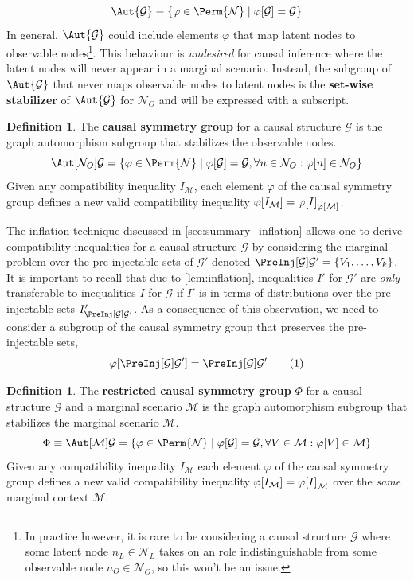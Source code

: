 \documentclass[aps, 10pt, english, twoside, pra, nofootinbib, longbibliography]{revtex4-1}
\theoremstyle{plain}
\theoremstyle{definition}
\newtheorem{definition}[theorem]{Definition}
\theoremstyle{remark}
\newcommand{\graph}{\mathcal{G}}
\newcommand{\nodes}{\mathcal{N}}
\newcommand{\gep}{\varphi}
\newcommand{\gp}{\Phi}
\newcommand{\mscenario}{\mathcal{M}}
\newcommand{\term}[1]{\textcolor{Mahogany}{\textbf{#1}}}
\begin{document}
    \[ \Aut{\graph} \defined \bc{\gep \in \Perm{\nodes} \mid \gep\bs{\graph} = \graph} \]
    In general, $\Aut{\graph}$ could include elements $\gep$ that map latent nodes to observable nodes\footnote{In practice however, it is rare to be considering a causal structure $\graph$ where some latent node $n_L \in \nodes_L$ takes on an role indistinguishable from some observable node $n_O \in \nodes_O$, so this won't be an issue.}. This behaviour is \textit{undesired} for causal inference where the latent nodes will never appear in a marginal scenario. Instead, the subgroup of $\Aut{\graph}$ that never maps observable nodes to latent nodes is the \term{set-wise stabilizer} of $\Aut{\graph}$ for $\nodes_O$ and will be expressed with a subscript.

    \begin{definition}
        The \term{causal symmetry group} for a causal structure $\graph$ is the graph automorphism subgroup that stabilizes the observable nodes.
        \[ \Aut[\nodes_O]{\graph} = \bc{\gep \in \Perm{\nodes} \mid \gep\bs{\graph} = \graph, \forall n \in \nodes_O :\gep\bs{n} \in \nodes_O} \]
        Given any compatibility inequality $I_{\mscenario}$, each element $\gep$ of the causal symmetry group defines a new valid compatibility inequality $\gep\bs{I_{\mscenario}} = \gep\bs{I}_{\gep\bs{\mscenario}}$.
    \end{definition}

    The inflation technique discussed in \cref{sec:summary_inflation} allows one to derive compatibility inequalities for a causal structure $\graph$ by considering the marginal problem over the pre-injectable sets of $\graph'$ denoted $\PreInj[\graph]{\graph'} = \bc{V_1, \ldots, V_k}$. It is important to recall that due to \cref{lem:inflation}, inequalities $I'$ for $\graph'$ are \textit{only} transferable to inequalities $I$ for $\graph$ if $I'$ is in terms of distributions over the pre-injectable sets $I'_{\PreInj[\graph]{\graph'}}$. As a consequence of this observation, we need to consider a subgroup of the causal symmetry group that preserves the pre-injectable sets,
    \[ \gep\bs{\PreInj[\graph]{\graph'}} = \PreInj[\graph]{\graph'} \eq \label{eq:preserved_preinj} \]

    \begin{definition}
        The \term{restricted causal symmetry group} $\gp$ for a causal structure $\graph$ and a marginal scenario $\mscenario$ is the graph automorphism subgroup that stabilizes the marginal scenario $\mscenario$.
        \[ \gp \defined \Aut[\mscenario]{\graph} = \bc{\gep \in \Perm{\nodes} \mid \gep\bs{\graph} = \graph, \forall V \in \mscenario : \gep\bs{V} \in \mscenario} \]
        Given any compatibility inequality $I_{\mscenario}$ each element $\gep$ of the causal symmetry group defines a new valid compatibility inequality $\gep\bs{I_{\mscenario}} = \gep\bs{I}_{\mscenario}$ over the \textit{same} marginal context $\mscenario$.
    \end{definition}
\end{document}
